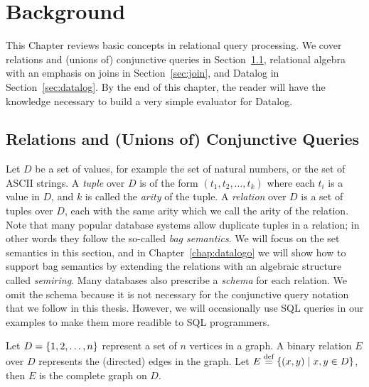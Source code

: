 \chapter{Background}
\label{chap:background}

This Chapter reviews basic concepts in relational query processing. 
We cover relations and (unions of) conjunctive queries in Section~\ref{sec:relations-and-conjunctive-queries},
 relational algebra with an emphasis on joins in Section~\ref{sec:join},
 and Datalog in Section~\ref{sec:datalog}.
By the end of this chapter, 
 the reader will have the knowledge necessary
 to build a very simple evaluator for Datalog.

\section{Relations and (Unions of) Conjunctive Queries}
\label{sec:relations-and-conjunctive-queries}

Let $D$ be a set of values, for example the set of natural numbers,
 or the set of ASCII strings.
A {\em tuple} over $D$ is of the form $(t_1, t_2, \ldots, t_k)$
 where each $t_i$ is a value in $D$,
 and $k$ is called the {\em arity} of the tuple.
A {\em relation} over $D$ is a set of tuples over $D$,
 each with the same arity which we call the arity of the relation.
Note that many popular database systems allow duplicate tuples in a relation;
 in other words they follow the so-called {\em bag semantics}.
We will focus on the set semantics in this section,
 and in Chapter~\ref{chap:datalogo} we will show how to
 support bag semantics by extending the relations
 with an algebraic structure called {\em semiring}.
Many databases also prescribe a {\em schema} for each relation.
We omit the schema because it is not necessary for the 
 conjunctive query notation that we follow in this thesis.
However, we will occasionally use SQL queries in our examples 
 to make them more readible to SQL programmers.

\begin{ex}
\label{ex:relation}
Let $D = \{1, 2, \ldots, n\}$ represent a set of $n$ vertices in a graph.
A binary relation $E$ over $D$ represents the (directed) edges in the graph.
Let $E \stackrel{\text{def}}{=} \{{(x, y)}\mid{x, y \in D}\}$, then $E$ is the complete graph on $D$.
\end{ex}

